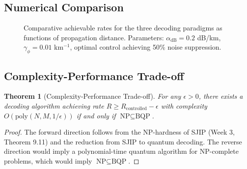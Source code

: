 \documentclass[12pt]{article}
\newtheorem{theorem}{Theorem}[section]
\begin{document}
\subsection{Numerical Comparison}

\begin{figure}[h]
\centering
{}
\caption{Comparative achievable rates for the three decoding paradigms as functions of propagation distance. Parameters: \(\alpha_{\text{dB}} = 0.2\) dB/km, \(\gamma_\phi = 0.01\) km\(^{-1}\), optimal control achieving 50\% noise suppression.}
\end{figure}

\subsection{Complexity-Performance Trade-off}

\begin{theorem}[Complexity-Performance Trade-off]
For any \(\epsilon > 0\), there exists a decoding algorithm achieving rate \(R \geq R_{\text{controlled}} - \epsilon\) with complexity \(O(\text{poly}(N, M, 1/\epsilon))\) if and only if \(\text{NP} \subseteq \text{BQP}\).
\end{theorem}

\begin{proof}
The forward direction follows from the NP-hardness of SJIP (Week 3, Theorem 9.11) and the reduction from SJIP to quantum decoding. The reverse direction would imply a polynomial-time quantum algorithm for NP-complete problems, which would imply \(\text{NP} \subseteq \text{BQP}\).
\end{proof}
\end{document}

